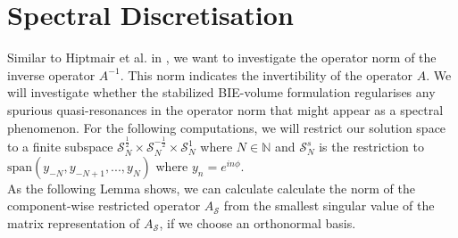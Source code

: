 \documentclass[12pt,journal,compsoc, onecolumn]{IEEEtran}
\begin{document}
\section{Spectral Discretisation}
\label{section:spectral_discretisation}
Similar to Hiptmair et al. in \cite{hiptmair2021spurious}, we want to investigate the operator norm of the inverse operator $A^{-1}$.  
This norm indicates the invertibility of the operator $A$. We will investigate whether the stabilized BIE-volume formulation regularises any spurious quasi-resonances in the operator norm that might appear as a spectral phenomenon. 
For the following computations, we will restrict our solution space to a finite subspace $\mathcal{S}_N^{\frac{1}{2}} 
\times \mathcal{S}_N^{-\frac{1}{2}} \times \mathcal{S}_N^{1}$ where $N \in \mathbb{N}$ 
and $\mathcal{S}_N^s$ is the restriction to $\mathrm{span}(y_{-N}, y_{-N+1}, ..., y_N)$ where $y_n = e^{in\phi}$.\\
As the following Lemma shows, we can calculate calculate the norm of the component-wise restricted operator $A_{\mathcal{S}}$ from the smallest singular value of the matrix representation of $A_{\mathcal{S}}$, if we choose an orthonormal basis.
\end{document}
